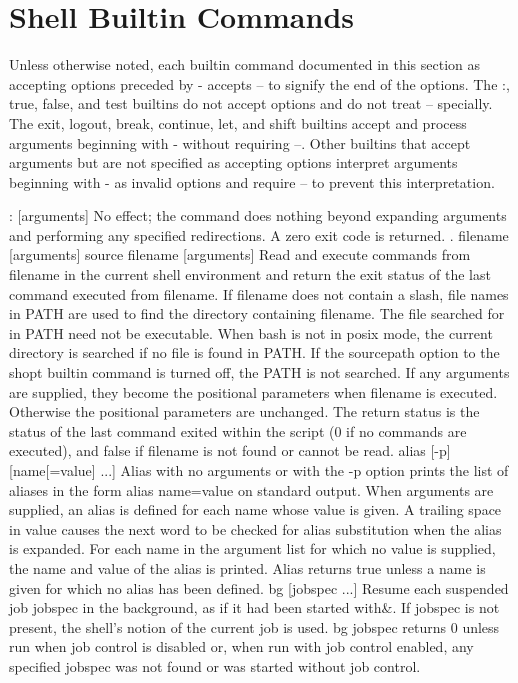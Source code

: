 \section{Shell Builtin Commands}\label{sec:shellbuiltincommands}
Unless otherwise noted, each builtin command documented in this section as accepting options preceded by - accepts -- to signify the end of the options. The :, true, false, and test builtins do not accept options and do not treat -- specially. The exit, logout, break, continue, let, and shift builtins accept and process arguments beginning with - without requiring --. Other builtins that accept arguments but are not specified as accepting options interpret arguments beginning with - as invalid options and require -- to prevent this interpretation.

: [arguments]
No effect; the command does nothing beyond expanding arguments and performing any specified redirections. A zero exit code is returned.
. filename [arguments]
source filename [arguments]
Read and execute commands from filename in the current shell environment and return the exit status of the last command executed from filename. If filename does not contain a slash, file names in PATH are used to find the directory containing filename. The file searched for in PATH need not be executable. When bash is not in posix mode, the current directory is searched if no file is found in PATH. If the sourcepath option to the shopt builtin command is turned off, the PATH is not searched. If any arguments are supplied, they become the positional parameters when filename is executed. Otherwise the positional parameters are unchanged. The return status is the status of the last command exited within the script (0 if no commands are executed), and false if filename is not found or cannot be read.
alias [-p] [name[=value] ...]
Alias with no arguments or with the -p option prints the list of aliases in the form alias name=value on standard output. When arguments are supplied, an alias is defined for each name whose value is given. A trailing space in value causes the next word to be checked for alias substitution when the alias is expanded. For each name in the argument list for which no value is supplied, the name and value of the alias is printed. Alias returns true unless a name is given for which no alias has been defined.
bg [jobspec ...]
Resume each suspended job jobspec in the background, as if it had been started with\&. If jobspec is not present, the shell's notion of the current job is used. bg jobspec returns 0 unless run when job control is disabled or, when run with job control enabled, any specified jobspec was not found or was started without job control.
